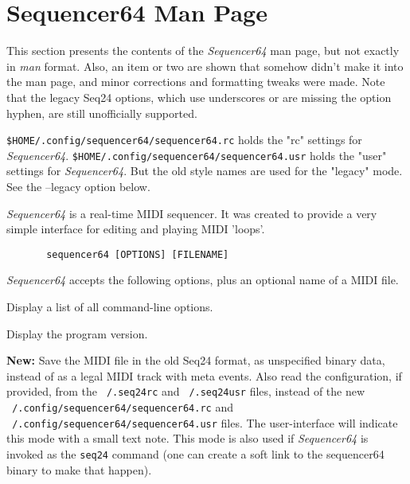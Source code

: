 %
%
%

\section{Sequencer64 Man Page}
\label{sec:seq64_man_page}

   This section presents the contents of the \textsl{Sequencer64} man page, but
   not exactly in \textsl{man} format.  Also, an item or two are shown that
   somehow didn't make it into the man page, and minor corrections and
   formatting tweaks were made.
   Note that the legacy Seq24 options, which use underscores or
   are missing the option hyphen, are still unofficially supported.

   \texttt{\$HOME/.config/sequencer64/sequencer64.rc} holds the "rc" settings
   for \textsl{Sequencer64}.
   \texttt{\$HOME/.config/sequencer64/sequencer64.usr} holds the "user" settings
   for \textsl{Sequencer64}.
   But the old style names are used for the "legacy" mode.  See the --legacy
   option below.

   \textsl{Sequencer64} is a real-time MIDI sequencer. It was created to
   provide a very simple interface for editing and playing MIDI 'loops'.

   \begin{verbatim}
       sequencer64 [OPTIONS] [FILENAME]
   \end{verbatim}

   \textsl{Sequencer64} accepts the following options, plus an optional name of
   a MIDI file.

   \setcounter{ItemCounter}{0}      %

      Display a list of all command-line options.

      Display the program version.

      \textbf{New:}
      Save the MIDI file in the old Seq24 format, as unspecified
      binary data, instead of as a legal MIDI track with meta events.
      Also read the configuration, if provided, from the
      \texttt{~/.seq24rc} and \texttt{~/.seq24usr} files,
      instead of the new
      \texttt{~/.config/sequencer64/sequencer64.rc} and
      \texttt{~/.config/sequencer64/sequencer64.usr} files.
      The user-interface will indicate this mode with a small text
      note.
      This mode is also used if \textsl{Sequencer64} is invoked as the
      \texttt{seq24} command (one can create a soft link to the sequencer64
      binary to make that happen).

